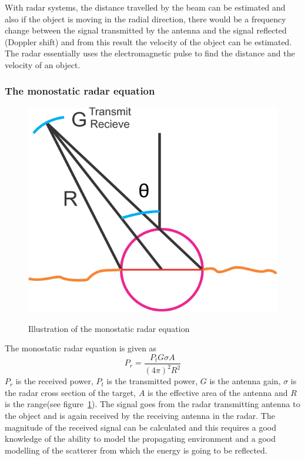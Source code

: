 With radar systems, the distance travelled by the beam can be estimated and also if the object is moving in the radial direction, there would be a frequency change between the signal transmitted by the antenna and the signal reflected (Doppler shift) and from this result the velocity of the object can be estimated. The radar essentially uses the electromagnetic pulse to find the distance and the velocity of an object.

\subsubsection{The monostatic radar equation}
\begin{figure}[h]
\centering
\includegraphics[width=.8\linewidth]{./graphics/new1}
\label{fig:new1}
\caption{Illustration of the monostatic radar equation}
\end{figure}

The monostatic radar equation is given as
\begin{dmath*}
P_{r}= \frac{P_t G\sigma A}{(4\pi)^{2}R^{2}}
\end{dmath*}
$P_{r}$ is the received power, $P_t$ is the transmitted power, $G$ is the antenna gain, $\sigma$ is the radar cross section of the target, $A$ is the effective area of the antenna and $R$ is the range(see  figure~\ref{fig:new1}). The signal goes from the radar transmitting antenna to the object and is again received by the receiving antenna in the radar. The magnitude of the received signal can be calculated and this requires a good knowledge of the ability to model the propagating environment and a good modelling of the scatterer from which the energy is going to be reflected.

